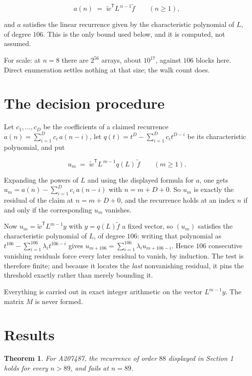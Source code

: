 \documentclass[11pt]{article}
\newtheorem{theorem}{Theorem}
\theoremstyle{definition}
\begin{document}
\[a(n) \;=\; \tilde w^{\mathsf T} L^{\,n-1} \tilde f \qquad (n \ge 1),\]

and $a$ satisfies the linear recurrence given by the characteristic polynomial of $L$, of degree $106$. This is the only bound used below, and it is computed, not assumed.

For scale: at $n = 8$ there are $2^{56}$ arrays, about $10^{17}$, against $106$ blocks here. Direct enumeration settles nothing at that size; the walk count does.

\section{The decision procedure}

Let $c_1,\dots,c_D$ be the coefficients of a claimed recurrence $a(n) = \sum_{i=1}^{D} c_i\,a(n-i)$, let $q(t) = t^{D} - \sum_{i=1}^{D} c_i t^{D-i}$ be its characteristic polynomial, and put

\[u_m \;=\; \tilde w^{\mathsf T} L^{\,m-1} q(L)\,\tilde f \qquad (m \ge 1).\]

Expanding the powers of $L$ and using the displayed formula for $a$, one gets $u_m = a(n) - \sum_{i=1}^{D} c_i\,a(n-i)$ with $n = m + D + 0$. So $u_m$ is exactly the residual of the claim at $n = m + D + 0$, and the recurrence holds at an index $n$ if and only if the corresponding $u_m$ vanishes.

Now $u_m = \tilde w^{\mathsf T} L^{m-1} y$ with $y = q(L)\tilde f$ a fixed vector, so $(u_m)$ satisfies the characteristic polynomial of $L$, of degree $106$: writing that polynomial as $t^{106} - \sum_{i=1}^{106} \lambda_i t^{106-i}$ gives $u_{m+106} = \sum_{i=1}^{106} \lambda_i u_{m+106-i}$. Hence $106$ consecutive vanishing residuals force every later residual to vanish, by induction. The test is therefore finite; and because it locates the {\itshape last} nonvanishing residual, it pins the threshold exactly rather than merely bounding it.

Everything is carried out in exact integer arithmetic on the vector $L^{m-1}y$. The matrix $M$ is never formed.

\section{Results}

\begin{theorem} For A207487, the recurrence of order $88$ displayed in Section 1 holds for every $n > 89$, and fails at $n = 89$.\end{theorem}
\end{document}
